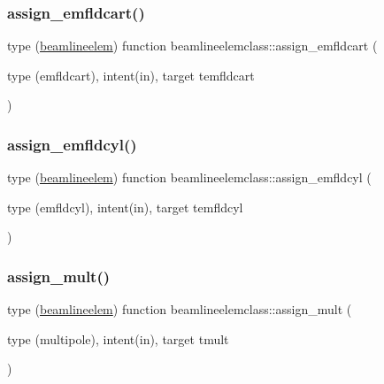 \mbox{\label{namespacebeamlineelemclass_af51b4befb67d269a6d71be8bbd50399b}} 
\subsubsection{\texorpdfstring{assign\_emfldcart()}{assign\_emfldcart()}}
{\footnotesize\ttfamily type (\mbox{\hyperlink{namespacebeamlineelemclass_structbeamlineelemclass_1_1beamlineelem}{beamlineelem}}) function beamlineelemclass\+::assign\+\_\+emfldcart (\begin{DoxyParamCaption}\item[{type (emfldcart), intent(in), target}]{temfldcart }\end{DoxyParamCaption})}

\mbox{\label{namespacebeamlineelemclass_a3d349f36feb9724cfcf498e03c191b29}} 
\subsubsection{\texorpdfstring{assign\_emfldcyl()}{assign\_emfldcyl()}}
{\footnotesize\ttfamily type (\mbox{\hyperlink{namespacebeamlineelemclass_structbeamlineelemclass_1_1beamlineelem}{beamlineelem}}) function beamlineelemclass\+::assign\+\_\+emfldcyl (\begin{DoxyParamCaption}\item[{type (emfldcyl), intent(in), target}]{temfldcyl }\end{DoxyParamCaption})}

\mbox{\label{namespacebeamlineelemclass_aacf4de73999b66f3e37bf58cda6e562b}} 
\subsubsection{\texorpdfstring{assign\_mult()}{assign\_mult()}}
{\footnotesize\ttfamily type (\mbox{\hyperlink{namespacebeamlineelemclass_structbeamlineelemclass_1_1beamlineelem}{beamlineelem}}) function beamlineelemclass\+::assign\+\_\+mult (\begin{DoxyParamCaption}\item[{type (multipole), intent(in), target}]{tmult }\end{DoxyParamCaption})}

